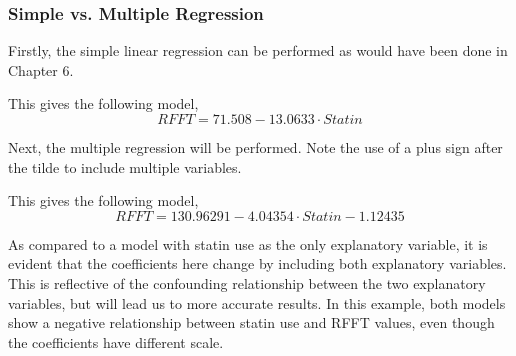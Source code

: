 \subsubsection{Simple vs. Multiple Regression}
Firstly, the simple linear regression can be performed as would have been done in Chapter 6.  
\begin{knitrout}
\color{fgcolor}\begin{kframe}
\begin{alltt}
\hlstd{(}\hlopt{$} \hlopt{~} \hlopt{$}
\end{alltt}


{\ttfamily\noindent\bfseries\color{errorcolor}{\#\# Error in eval(expr, envir, enclos): object 'statins' not found}}\end{kframe}
\end{knitrout}
This gives the following model, 
\[ RFFT = 71.508 - 13.0633\cdot Statin \]

Next, the multiple regression will be performed. Note the use of a plus sign after the tilde to include multiple variables.   
\begin{knitrout}
\color{fgcolor}\begin{kframe}
\begin{alltt}
\hlstd{(}\hlopt{$} \hlopt{~} \hlopt{$} \hlopt{+} \hlopt{$}
\end{alltt}


{\ttfamily\noindent\bfseries\color{errorcolor}{\#\# Error in eval(expr, envir, enclos): object 'statins' not found}}\end{kframe}
\end{knitrout}
This gives the following model, 
\[ RFFT = 130.96291 - 4.04354\cdot Statin - 1.12435\]

As compared to a model with statin use as the only explanatory variable, it is evident that the coefficients here change by including both explanatory variables.  This is reflective of the confounding relationship between the two explanatory variables, but will lead us to more accurate results.  In this example, both models show a negative relationship between statin use and RFFT values, even though the coefficients have different scale.  
